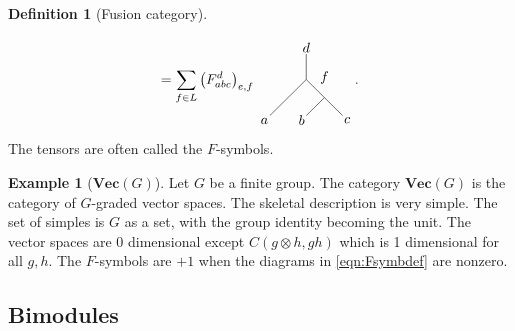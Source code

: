 \documentclass[aps,prx,twocolumn,superscriptaddress,noshowkeys]{revtex4-2}  %
\renewcommand{\Vec}{\textbf{Vec}}
\theoremstyle{plain}%
\theoremstyle{definition}
\newtheorem{definition}{Definition}[section]
\newtheorem{example}{Example}[section]
\theoremstyle{remark}
\begin{document}
\begin{definition}[Fusion category]
\begin{itemize}
\begin{equation}
		=\sum_{f\in L}\left(F_{abc}^{d}\right)_{e,f}
		\begin{tikzpicture}[scale=0.65,baseline=(current bounding box.center)]
		\draw (0,0)--(0,1) node[pos=1.25] {$d$};
		\draw (.707,-.707)--(1.41,-1.41) node[pos=1.25] {$c$};
		\draw (0,0)--(.707,-.707) node [pos=.5,above right] {$f$};
		\draw (0,0)--(-1.41,-1.41)node[pos=1.15] {$a$};
		\draw (.707,-.707)--(0,-1.41)node[pos=1.25] {$b$};
		\end{tikzpicture}.\label{eqn:Fsymbdef}
		\end{equation} 
		The tensors are often called the $F$-symbols.
	\end{itemize}
\end{definition}

\begin{example}[$\Vec(G)$]\label{example:vecG}
	Let $G$ be a finite group. The category $\Vec(G)$ is the category of $G$-graded vector spaces. The skeletal description is very simple. The set of simples is $G$ as a set, with the group identity becoming the unit. The vector spaces are 0 dimensional except $C(g\otimes h, gh)$ which is 1 dimensional for all $g,h$. The $F$-symbols are $+1$ when the diagrams in \eqref{eqn:Fsymbdef} are nonzero.
\end{example}

\subsection{Bimodules}
\end{document}
